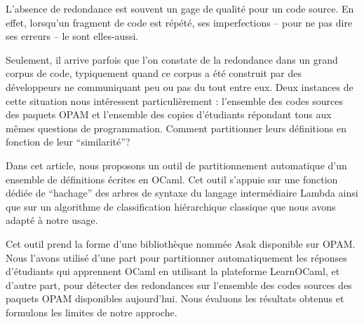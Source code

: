 L'absence de redondance est souvent un gage de qualité pour un code
source. En effet, lorsqu'un fragment de code est répété, ses
imperfections -- pour ne pas dire ses erreurs -- le sont elles-aussi.

Seulement, il arrive parfois que l'on constate de la redondance dans
un grand corpus de code, typiquement quand ce corpus a été construit
par des développeurs ne communiquant peu ou pas du tout entre
eux. Deux instances de cette situation nous intéressent
particulièrement : l'ensemble des codes sources des paquets OPAM et
l'ensemble des copies d'étudiants répondant tous aux mêmes questions
de programmation. Comment partitionner leurs définitions en fonction
de leur ``similarité''?

Dans cet article, nous proposons un outil de partitionnement
automatique d'un ensemble de définitions écrites en OCaml. Cet outil
s'appuie sur une fonction dédiée de ``hachage'' des arbres de syntaxe
du langage intermédiaire Lambda ainsi que sur un algorithme de
classification hiérarchique classique que nous avons adapté à notre
usage.

Cet outil prend la forme d'une bibliothèque nommée Asak disponible sur
OPAM. Nous l'avons utilisé d'une part pour partitionner
automatiquement les réponses d'étudiants qui apprennent OCaml en
utilisant la plateforme LearnOCaml, et d'autre part, pour détecter des
redondances sur l'ensemble des codes sources des paquets OPAM
disponibles aujourd'hui. Nous évaluons les résultats obtenus
et formulons les limites de notre approche.
